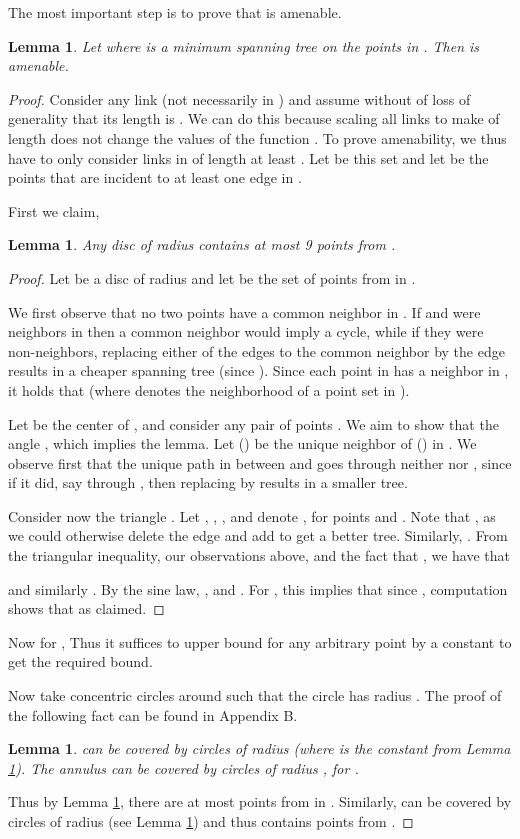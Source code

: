 \documentclass[11pt]{amsart}
\newcounter{foo}
\newtheorem{lemma}[foo]{Lemma}
\begin{document}
The most important step is to prove that  is amenable.
\begin{lemma}
Let  where  is a minimum spanning tree on the points in . Then  is amenable.
\label{lem:approx}
\end{lemma}
\begin{proof}
Consider any link  (not necessarily in ) and assume without of loss of generality that its length is . 
We can do this because scaling all links to make  of length  does not change the values of the function 
.
To prove
amenability, we thus have to only consider links in  of length at least . Let  be this set and let  be the points that are incident to at least one edge in .

First we claim,
\begin{lemma}
Any disc of radius  contains at most 9 points from . 
\label{pointsincircle}
\end{lemma}
\begin{proof}
Let  be a disc of radius  and 
let  be the set of points from  in .  


We first observe that no two points  have a common
neighbor in .
If  and  were neighbors in  then a common neighbor would imply a cycle, while if they were non-neighbors,
replacing either of the edges to the common neighbor by the edge  
results in a cheaper spanning tree (since ).
Since each point in  has a neighbor in , it holds that  (where  
denotes the neighborhood of a point set  in ).

Let  be the center of , and consider any pair of points . 
We aim to show that the angle , which implies the lemma.
Let  () be the unique neighbor of  () in .
We observe first that the unique path in  between 
and  goes through neither  nor , since if it did, say
through , then replacing  by  results in a 
smaller tree.  

Consider now the triangle .  Let , 
, , and denote
, for points  and .
Note that , as
we could otherwise delete the edge  and add  to get a
better tree. Similarly, .
From the triangular inequality, our observations above, and the
fact that , we have that

and similarly .
By the sine law, ,
and .
For , this implies that since , computation shows that  as claimed.
\end{proof}

Now for , 
Thus it suffices to upper bound  for any arbitrary point  by a constant
to get the required bound.

Now take concentric circles  around  such that the  
circle has radius .
The proof of the following fact
can be found in Appendix B. 
\begin{lemma}
 can be covered by  circles of radius 
 (where  is the constant from Lemma \ref{pointsincircle}). 
The annulus  can be covered by  circles of radius , for .
\label{ddim}
\end{lemma}
Thus by Lemma \ref{pointsincircle}, there are at most  points from  in . Similarly,
 can be covered by  circles of radius  (see Lemma \ref{ddim}) and thus contains  points from .


\end{proof}
\end{document}
